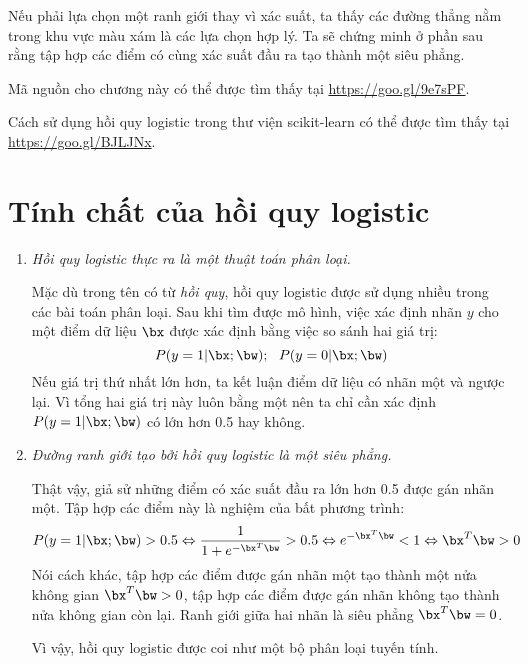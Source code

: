 Nếu phải lựa chọn một ranh giới thay vì xác suất, ta thấy các đường thẳng nằm
trong khu vực màu xám là các lựa chọn hợp lý. Ta sẽ chứng minh ở phần sau rằng
tập hợp các điểm có cùng xác suất đầu ra tạo thành một siêu phẳng.

Mã nguồn cho chương này có thể được tìm thấy tại
    \url{https://goo.gl/9e7sPF}. 

Cách sử dụng hồi quy logistic trong thư viện scikit-learn có thể được tìm thấy tại \url{https://goo.gl/BJLJNx}.

 
\section{Tính chất của hồi quy logistic}
\begin{enumerate}
    \item \textit{Hồi quy logistic thực ra là một thuật toán phân loại.}

    Mặc dù trong tên có từ \textit{hồi quy}, hồi quy logistic được sử dụng nhiều
    trong các bài toán phân loại. Sau khi tìm được mô hình, việc xác định
    nhãn $y$ cho một điểm dữ liệu $\bx$ được xác định bằng việc so sánh
    hai giá trị:
    \begin{equation} 
    P(y = 1| \bx; \bw); ~~ P(y = 0| \bx; \bw)  
    \end{equation} 
    Nếu giá trị thứ nhất lớn hơn, ta kết luận điểm dữ liệu có nhãn một và
    ngược lại. Vì tổng hai giá trị này luôn bằng một nên ta chỉ cần xác định
    $P(y = 1| \bx; \bw)$ có lớn hơn 0.5 hay không.

 
 
    \item \textit{Đường ranh giới tạo bởi hồi quy logistic là một siêu phẳng.}
    
    Thật vậy, giả sử những điểm có xác suất đầu ra lớn hơn 0.5 được gán nhãn một. Tập hợp các điểm này là nghiệm của bất phương trình:
    \begin{eqnarray*} 
    P(y = 1| \bx; \bw) > 0.5 
    \Leftrightarrow \frac{1}{1 + e^{-\bx^T\bw}} > 0.5 
    \Leftrightarrow e^{-\bx^T\bw} < 1 
    \Leftrightarrow \bx^T\bw > 0 
    \end{eqnarray*} 
    Nói cách khác, tập hợp các điểm được gán nhãn một tạo thành một nửa không gian $\bx^T\bw > 0$, tập hợp các điểm được gán nhãn không tạo thành nửa không gian còn lại. Ranh giới giữa hai nhãn là siêu phẳng $\bx^T\bw = 0$. 

    Vì vậy, hồi quy logistic được coi như một bộ phân loại tuyến tính. 
    

\end{enumerate}
